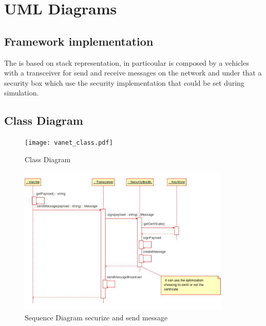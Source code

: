\section{UML Diagrams}
\subsection{Framework implementation}
The \vs is based on stack representation, in particoular is composed by a vehicles with a transceiver for send and receive messages on the network and under that a security box which use the security implementation that could be set during simulation.
\subsection{Class Diagram}
\begin{figure}[ht]
\centerline{\texttt{[image: vanet\_class.pdf]}}
\caption{Class Diagram}
\label{fig:class_diagram}
\end{figure}
\begin{figure}[ht]
\centerline{\includegraphics[width=0.9\textwidth]{baseline_send_message.pdf}}
\caption{Sequence Diagram \baseline securize and send message}
\label{fig:sequence_send_baseline}
\end{figure}
